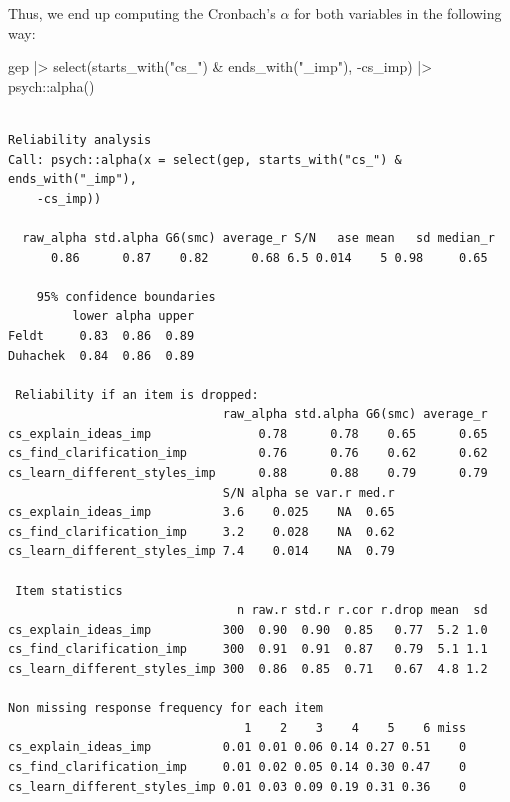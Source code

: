 \documentclass[
  letterpaper,
]{krantz}
\makeatletter
\newenvironment{Shaded}{\begin{snugshade}}{\end{snugshade}}
\newcommand{\FunctionTok}[1]{\textcolor[rgb]{0.28,0.35,0.67}{#1}}
\newcommand{\NormalTok}[1]{\textcolor[rgb]{0.00,0.23,0.31}{#1}}
\newcommand{\SpecialCharTok}[1]{\textcolor[rgb]{0.37,0.37,0.37}{#1}}
\newcommand{\StringTok}[1]{\textcolor[rgb]{0.13,0.47,0.30}{#1}}
\newenvironment{kframe}{%
\medskip{}
\setlength{\fboxsep}{.8em}
 \def\at@end@of@kframe{}%
 \ifinner\ifhmode%
  \def\at@end@of@kframe{\end{minipage}}%
  \begin{minipage}{\columnwidth}%
 \fi\fi%
 \def\FrameCommand##1{\hskip\@totalleftmargin \hskip-\fboxsep
 \colorbox{shadecolor}{##1}\hskip-\fboxsep
     \hskip-\linewidth \hskip-\@totalleftmargin \hskip\columnwidth}%
 \MakeFramed {\advance\hsize-\width
   \@totalleftmargin\z@ \linewidth\hsize
   \@setminipage}}%
 {\par\unskip\endMakeFramed%
 \at@end@of@kframe}
\renewenvironment{Shaded}{\begin{kframe}}{\end{kframe}}
\makeatother
\begin{document}
Thus, we end up computing the Cronbach's \(\alpha\) for both variables
in the following way:

\begin{Shaded}
\begin{Highlighting}[]
\NormalTok{gep }\SpecialCharTok{|\textgreater{}}
  \FunctionTok{select}\NormalTok{(}\FunctionTok{starts\_with}\NormalTok{(}\StringTok{"cs\_"}\NormalTok{) }\SpecialCharTok{\&} \FunctionTok{ends\_with}\NormalTok{(}\StringTok{"\_imp"}\NormalTok{), }\SpecialCharTok{{-}}\NormalTok{cs\_imp) }\SpecialCharTok{|\textgreater{}}
\NormalTok{  psych}\SpecialCharTok{::}\FunctionTok{alpha}\NormalTok{()}
\end{Highlighting}
\end{Shaded}

\begin{verbatim}

Reliability analysis   
Call: psych::alpha(x = select(gep, starts_with("cs_") & ends_with("_imp"), 
    -cs_imp))

  raw_alpha std.alpha G6(smc) average_r S/N   ase mean   sd median_r
      0.86      0.87    0.82      0.68 6.5 0.014    5 0.98     0.65

    95% confidence boundaries 
         lower alpha upper
Feldt     0.83  0.86  0.89
Duhachek  0.84  0.86  0.89

 Reliability if an item is dropped:
                              raw_alpha std.alpha G6(smc) average_r
cs_explain_ideas_imp               0.78      0.78    0.65      0.65
cs_find_clarification_imp          0.76      0.76    0.62      0.62
cs_learn_different_styles_imp      0.88      0.88    0.79      0.79
                              S/N alpha se var.r med.r
cs_explain_ideas_imp          3.6    0.025    NA  0.65
cs_find_clarification_imp     3.2    0.028    NA  0.62
cs_learn_different_styles_imp 7.4    0.014    NA  0.79

 Item statistics 
                                n raw.r std.r r.cor r.drop mean  sd
cs_explain_ideas_imp          300  0.90  0.90  0.85   0.77  5.2 1.0
cs_find_clarification_imp     300  0.91  0.91  0.87   0.79  5.1 1.1
cs_learn_different_styles_imp 300  0.86  0.85  0.71   0.67  4.8 1.2

Non missing response frequency for each item
                                 1    2    3    4    5    6 miss
cs_explain_ideas_imp          0.01 0.01 0.06 0.14 0.27 0.51    0
cs_find_clarification_imp     0.01 0.02 0.05 0.14 0.30 0.47    0
cs_learn_different_styles_imp 0.01 0.03 0.09 0.19 0.31 0.36    0
\end{verbatim}
\end{document}
